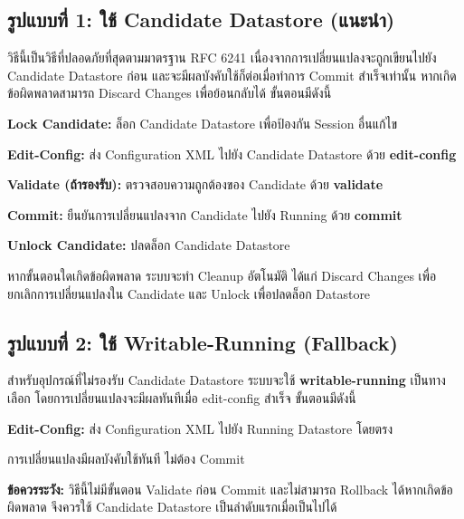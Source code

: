 \subsection{รูปแบบที่ 1: ใช้ Candidate Datastore (แนะนำ)}
\hspace*{1.3em}
วิธีนี้เป็นวิธีที่ปลอดภัยที่สุดตามมาตรฐาน RFC 6241 เนื่องจากการเปลี่ยนแปลงจะถูกเขียนไปยัง Candidate Datastore ก่อน และจะมีผลบังคับใช้ก็ต่อเมื่อทำการ Commit สำเร็จเท่านั้น หากเกิดข้อผิดพลาดสามารถ Discard Changes เพื่อย้อนกลับได้ ขั้นตอนมีดังนี้

\begin{mycustomenum2}
    \item \textbf{Lock Candidate:} ล็อก Candidate Datastore เพื่อป้องกัน Session อื่นแก้ไข
    \item \textbf{Edit-Config:} ส่ง Configuration XML ไปยัง Candidate Datastore ด้วย \textbf{edit-config}
    \item \textbf{Validate (ถ้ารองรับ):} ตรวจสอบความถูกต้องของ Candidate ด้วย \textbf{validate}
    \item \textbf{Commit:} ยืนยันการเปลี่ยนแปลงจาก Candidate ไปยัง Running ด้วย \textbf{commit}
    \item \textbf{Unlock Candidate:} ปลดล็อก Candidate Datastore
\end{mycustomenum2}

\hspace*{1.3em}
หากขั้นตอนใดเกิดข้อผิดพลาด ระบบจะทำ Cleanup อัตโนมัติ ได้แก่ Discard Changes เพื่อยกเลิกการเปลี่ยนแปลงใน Candidate และ Unlock เพื่อปลดล็อก Datastore

\subsection{รูปแบบที่ 2: ใช้ Writable-Running (Fallback)}
\hspace*{1.3em}
สำหรับอุปกรณ์ที่ไม่รองรับ Candidate Datastore ระบบจะใช้ \textbf{writable-running} เป็นทางเลือก โดยการเปลี่ยนแปลงจะมีผลทันทีเมื่อ edit-config สำเร็จ ขั้นตอนมีดังนี้

\begin{mycustomenum2}
    \item \textbf{Edit-Config:} ส่ง Configuration XML ไปยัง Running Datastore โดยตรง
    \item การเปลี่ยนแปลงมีผลบังคับใช้ทันที ไม่ต้อง Commit
\end{mycustomenum2}

\hspace*{1.3em}
\textbf{ข้อควรระวัง:} วิธีนี้ไม่มีขั้นตอน Validate ก่อน Commit และไม่สามารถ Rollback ได้หากเกิดข้อผิดพลาด จึงควรใช้ Candidate Datastore เป็นลำดับแรกเมื่อเป็นไปได้

